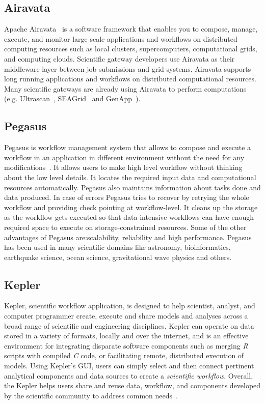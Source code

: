 \subsection{Airavata}

Apache Airavata~\cite{www-airavata} is a software framework that
enables you to compose, manage, execute, and monitor large scale
applications and workflows on distributed computing resources such as
local clusters, supercomputers, computational grids, and computing
clouds. Scientific gateway developers use Airavata as their middleware
layer between job submissions and grid systems. Airavata supports long
running applications and workflows on distributed computational
resources. Many scientific gateways are already using Airavata to
perform computations (e.g. Ultrascan~\cite{www-ultrascan},
SEAGrid~\cite{www-seagrid} and GenApp~\cite{www-genapp}).

   \pv

\subsection{Pegasus}\label{S:pegasus}

Pegasus is workflow management system that allows to compose and
execute a workflow in an application in different environment without
the need for any modifications~\cite{www-Pegasus}. It allows users to
make high level workflow without thinking about the low level
details. It locates the required input data and computational
resources automatically.  Pegasus also maintains information about
tasks done and data produced. In case of errors Pegasus tries to
recover by retrying the whole workflow and providing check pointing at
workflow-level.  It cleans up the storage as the workflow gets
executed so that data-intensive workflows can have enough required
space to execute on storage-constrained resources. Some of the other
advantages of Pegasus are:scalability, reliability and high
performance. Pegasus has been used in many scientific domains like
astronomy, bioinformatics, earthquake science, ocean science,
gravitational wave physics and others.

   \pv


\subsection{Kepler}
 
Kepler, scientific workflow application, is designed to help
scientist, analyst, and computer programmer create, execute and share
models and analyses across a broad range of scientific and engineering
disciplines.  Kepler can operate on data stored in a variety of
formats, locally and over the internet, and is an effective
environment for integrating disparate software components such as
merging \textit{R} scripts with compiled \textit{C} code, or facilitating remote,
distributed execution of models. Using Kepler's GUI, users can simply
select and then connect pertinent analytical components and data
sources to create a \textit{scientific workflow}. Overall, the Kepler helps
users share and reuse data, workflow, and components developed by the
scientific community to address common needs~\cite{www-kepler}.

